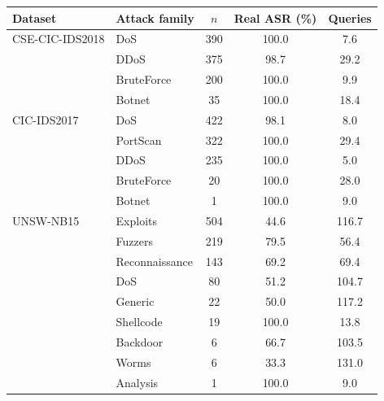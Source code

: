 \begin{tabular}{@{}llccc@{}}
\toprule
\textbf{Dataset} & \textbf{Attack family} & \textbf{$n$} & \textbf{Real ASR (\%)} & \textbf{Queries} \\
\midrule
CSE-CIC-IDS2018 & DoS & 390 & 100.0 & 7.6 \\
 & DDoS & 375 & 98.7 & 29.2 \\
 & BruteForce & 200 & 100.0 & 9.9 \\
 & Botnet & 35 & 100.0 & 18.4 \\
\midrule
CIC-IDS2017 & DoS & 422 & 98.1 & 8.0 \\
 & PortScan & 322 & 100.0 & 29.4 \\
 & DDoS & 235 & 100.0 & 5.0 \\
 & BruteForce & 20 & 100.0 & 28.0 \\
 & Botnet & 1 & 100.0 & 9.0 \\
\midrule
UNSW-NB15 & Exploits & 504 & 44.6 & 116.7 \\
 & Fuzzers & 219 & 79.5 & 56.4 \\
 & Reconnaissance & 143 & 69.2 & 69.4 \\
 & DoS & 80 & 51.2 & 104.7 \\
 & Generic & 22 & 50.0 & 117.2 \\
 & Shellcode & 19 & 100.0 & 13.8 \\
 & Backdoor & 6 & 66.7 & 103.5 \\
 & Worms & 6 & 33.3 & 131.0 \\
 & Analysis & 1 & 100.0 & 9.0 \\
\bottomrule
\end{tabular}
